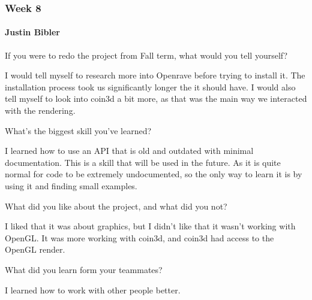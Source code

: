 {
\subsubsection{Week 8}
\paragraph{Justin Bibler}
If you were to redo the project from Fall term, what would you tell yourself? \\ \par \vspace{3mm}

I would tell myself to research more into Openrave before trying to install it. 
The installation process took us significantly longer the it should have. 
I would also tell myself to look into coin3d a bit more, as that was the main way we interacted with the rendering. \\ \par \vspace{3mm}

What's the biggest skill you've learned? \\ \par \vspace{3mm}

I learned how to use an API that is old and outdated with minimal documentation. 
This is a skill that will be used in the future. 
As it is quite normal for code to be extremely undocumented, so the only way to learn it is by using it and finding small examples. \\ \par \vspace{3mm}

What did you like about the project, and what did you not? \\ \par \vspace{3mm}

I liked that it was about graphics, but I didn't like that it wasn't working with OpenGL. 
It was more working with coin3d, and coin3d had access to the OpenGL render. \\ \par \vspace{3mm}

What did you learn form your teammates? \\ \par \vspace{3mm}

I learned how to work with other people better. \\ \par \vspace{3mm}

}
